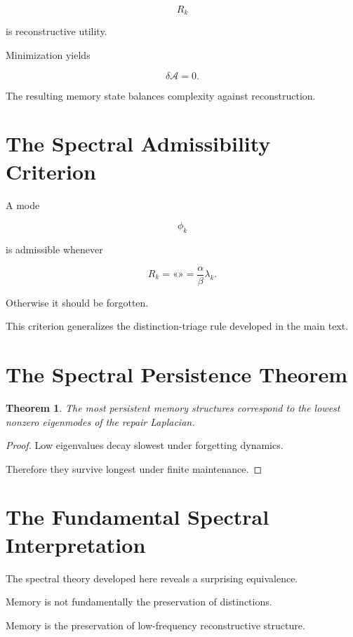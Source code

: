 \documentclass[12pt,oneside]{book}
\theoremstyle{plain} \newtheorem{theorem}{Theorem}[chapter] \newtheorem{lemma}[theorem]{Lemma} \newtheorem{proposition}[theorem]{Proposition} \newtheorem{corollary}[theorem]{Corollary}
\theoremstyle{definition} \newtheorem{definition}[theorem]{Definition} \newtheorem{axiom}[theorem]{Axiom} \newtheorem{construction}[theorem]{Construction}
\theoremstyle{remark} \newtheorem{remark}[theorem]{Remark} \newtheorem{example}[theorem]{Example}
\begin{document}
\[
R_k
\]

is reconstructive utility.

Minimization yields

\[
\delta \mathcal A
=
0. 

\]

The resulting memory state balances complexity against reconstruction.

\section{The Spectral Admissibility Criterion}

A mode

\[
\phi_k
\]

is admissible whenever

\[
R_k
=
«»
=
\frac{\alpha}{\beta}
\lambda_k.
\]

Otherwise it should be forgotten.

This criterion generalizes the distinction-triage rule developed in the main text.

\section{The Spectral Persistence Theorem}

\begin{theorem}

The most persistent memory structures correspond to the lowest nonzero eigenmodes of the repair Laplacian.

\end{theorem}

\begin{proof}

Low eigenvalues decay slowest under forgetting dynamics.

Therefore they survive longest under finite maintenance.

\end{proof}

\section{The Fundamental Spectral Interpretation}

The spectral theory developed here reveals a surprising equivalence.

Memory is not fundamentally the preservation of distinctions.

Memory is the preservation of low-frequency reconstructive structure.
\end{document}
